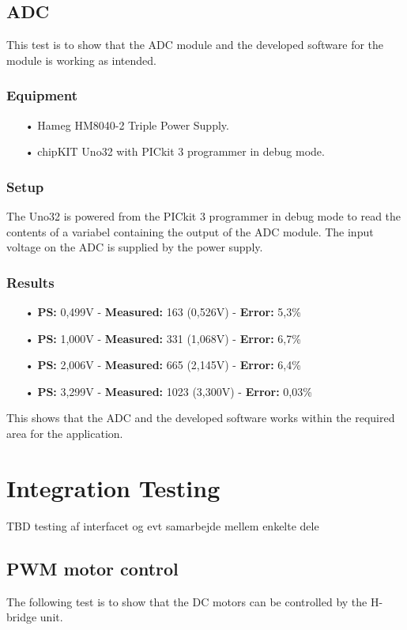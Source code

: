 \subsection{ADC}
This test is to show that the ADC module and the developed software for the module is working as intended.

\subsubsection{Equipment}
\begin{enumerate}
	\item[•]Hameg HM8040-2 Triple Power Supply.
	\item[•]chipKIT Uno32 with PICkit 3 programmer in debug mode.
\end{enumerate}

\subsubsection{Setup}
The Uno32 is powered from the PICkit 3 programmer in debug mode to read the contents of a variabel containing the output of the ADC module.
The input voltage on the ADC is supplied by the power supply.

\subsubsection{Results}
\begin{enumerate}
	\item[•] \textbf{PS:} 0,499V - \textbf{Measured:} 163 (0,526V) - \textbf{Error:} 5,3\%
	\item[•] \textbf{PS:} 1,000V - \textbf{Measured:} 331 (1,068V) - \textbf{Error:} 6,7\%
	\item[•] \textbf{PS:} 2,006V - \textbf{Measured:} 665 (2,145V) - \textbf{Error:} 6,4\%
	\item[•] \textbf{PS:} 3,299V - \textbf{Measured:} 1023 (3,300V) - \textbf{Error:} 0,03\%
\end{enumerate}
This shows that the ADC and the developed software works within the required area for the application.

\section{Integration Testing}
TBD testing af interfacet og evt samarbejde mellem enkelte dele

\subsection{PWM motor control}
The following test is to show that the DC motors can be controlled by the H-bridge unit.

